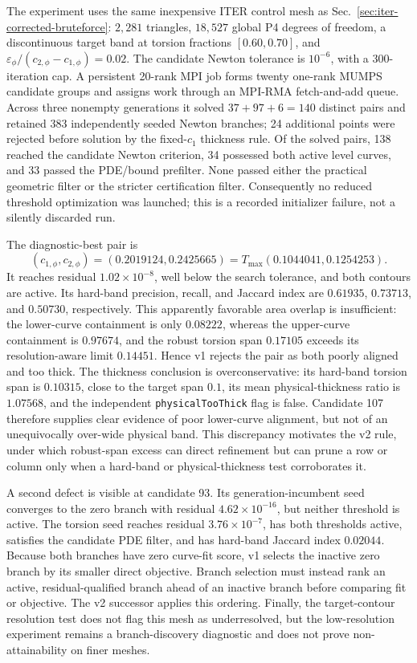 The experiment uses the same inexpensive ITER control mesh as
Sec.~\ref{sec:iter-corrected-bruteforce}: \(2{,}281\) triangles,
\(18{,}527\) global P4 degrees of freedom, a discontinuous target band at
torsion fractions \([0.60,0.70]\), and
\(\varepsilon_\phi/(c_{2,\phi}-c_{1,\phi})=0.02\).  The candidate Newton
tolerance is \(10^{-6}\), with a 300-iteration cap.  A persistent 20-rank MPI
job forms twenty one-rank MUMPS candidate groups and assigns work through an
MPI-RMA fetch-and-add queue.  Across three nonempty generations it solved
\(37+97+6=140\) distinct pairs and retained 383 independently seeded Newton
branches; 24 additional points were rejected before solution by the
fixed-\(c_1\) thickness rule.  Of the solved pairs, 138 reached the candidate
Newton criterion, 34 possessed both active level curves, and 33 passed the
PDE/bound prefilter.  None passed either the practical geometric filter or
the stricter certification filter.  Consequently no reduced threshold
optimization was launched; this is a recorded initializer failure, not a
silently discarded run.

The diagnostic-best pair is
\[
 (c_{1,\phi},c_{2,\phi})=(0.2019124,0.2425665)
 =T_{\max}(0.1044041,0.1254253).
\]
It reaches residual \(1.02\times10^{-8}\), well below the search tolerance,
and both contours are active.  Its hard-band precision, recall, and Jaccard
index are \(0.61935\), \(0.73713\), and \(0.50730\), respectively.  This
apparently favorable area overlap is insufficient: the lower-curve
containment is only \(0.08222\), whereas the upper-curve containment is
\(0.97674\), and the robust torsion span \(0.17105\) exceeds its
resolution-aware limit \(0.14451\).  Hence v1 rejects the pair as both poorly
aligned and too thick.  The thickness conclusion is overconservative: its
hard-band torsion span is \(0.10315\), close to the target span \(0.1\), its
mean physical-thickness ratio is \(1.07568\), and the independent
\texttt{physicalTooThick} flag is false.  Candidate 107 therefore supplies
clear evidence of poor lower-curve alignment, but not of an unequivocally
over-wide physical band.  This discrepancy motivates the v2 rule, under which
robust-span excess can direct refinement but can prune a row or column only
when a hard-band or physical-thickness test corroborates it.

A second defect is visible at candidate 93.  Its generation-incumbent seed
converges to the zero branch with residual \(4.62\times10^{-16}\), but neither
threshold is active.  The torsion seed reaches residual
\(3.76\times10^{-7}\), has both thresholds active, satisfies the candidate PDE
filter, and has hard-band Jaccard index \(0.02044\).  Because both branches
have zero curve-fit score, v1 selects the inactive zero branch by its smaller
direct objective.  Branch selection must instead rank an active,
residual-qualified branch ahead of an inactive branch before comparing fit or
objective.  The v2 successor applies this ordering.  Finally, the
target-contour resolution test does not flag this mesh as underresolved, but
the low-resolution experiment remains a branch-discovery diagnostic and does
not prove non-attainability on finer meshes.

